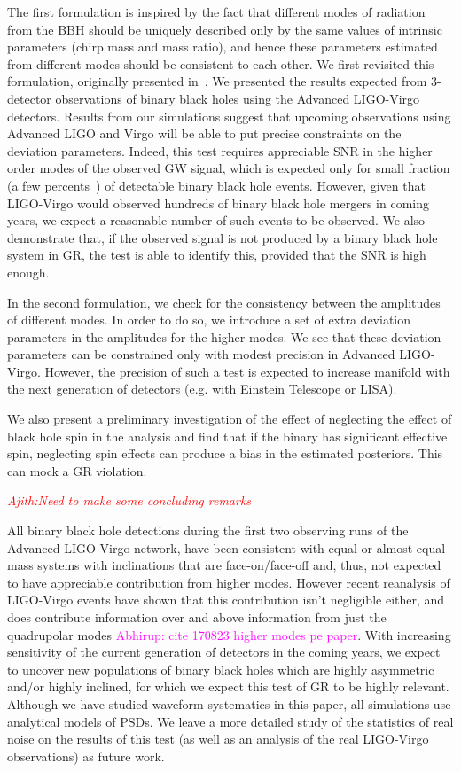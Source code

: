 \documentclass[prd,preprintnumbers,twocolumn,eqsecnum,floatfix,a4paper,nofootinbib,superscriptaddress]{revtex4}
\newcommand{\ajith}[1]{\textcolor{red}{\textit{Ajith:#1}}}
\newcommand{\abhirup}[1]{\textcolor{magenta}{Abhirup: #1}}
\begin{document}
The first formulation is inspired by the fact that different modes of radiation from the BBH should be uniquely described only by the same values of intrinsic parameters (chirp mass and mass ratio), and hence these parameters estimated from different modes should be consistent to each other. We first revisited this formulation, originally presented in~\cite{Dhanpal:2018ufk}. We presented the results expected from 3-detector observations of binary black holes using the Advanced LIGO-Virgo detectors. Results from our simulations suggest that upcoming observations using Advanced LIGO and Virgo will be able to put precise constraints on the deviation parameters. Indeed, this test requires appreciable SNR in the higher order modes of the observed GW signal, which is expected only for small fraction (a few percents~\cite{Dhanpal}) of detectable binary black hole events. However, given that LIGO-Virgo would observed hundreds of binary black hole mergers in coming years, we expect a reasonable number of such events to be observed. We also demonstrate that, if the observed signal is not produced by a binary black hole system in GR, the test is able to identify this, provided that the SNR is high enough. 

In the second formulation, we check for the consistency between the amplitudes of different modes. In order to do so, we introduce a set of extra deviation parameters in the amplitudes for the higher modes. We see that these deviation parameters can be constrained only with modest precision in Advanced LIGO-Virgo. However, the precision of such a test is expected to increase manifold with the next generation of detectors (e.g. with Einstein Telescope or LISA). 

We also present a preliminary investigation of the effect of neglecting the effect of black hole spin in the analysis and find that if the binary has significant effective spin, neglecting spin effects can produce a bias in the estimated posteriors. This can mock a GR violation. 

\ajith{Need to make some concluding remarks}


All binary black hole detections during the first two observing runs of the Advanced LIGO-Virgo network, have been consistent with equal or almost equal-mass systems with inclinations that are face-on/face-off and, thus, not expected to have appreciable contribution from higher modes. However recent reanalysis of LIGO-Virgo events have shown that this contribution isn't negligible either, and does contribute information over and above information from just the quadrupolar modes \abhirup{cite 170823 higher modes pe paper}. With increasing sensitivity of the current generation of detectors in the coming years, we expect to uncover new populations of binary black holes which are highly asymmetric and/or highly inclined, for which we expect this test of GR to be highly relevant. Although we have studied waveform systematics in this paper, all simulations use analytical models of PSDs. We leave a more detailed study of the statistics of real noise on the results of this test (as well as an analysis of the real LIGO-Virgo observations) as future work.
\end{document}
